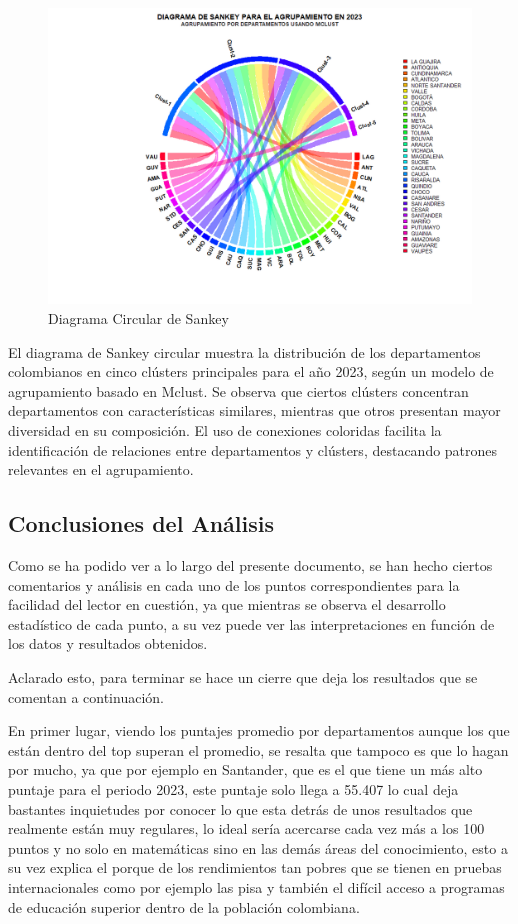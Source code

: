 \documentclass[12pt]{article}
\begin{document}
\begin{figure}[H]
    \centering
    \includegraphics[width=0.8\linewidth]{Imagenes/SankeyIndividual.png}
    \caption{Diagrama Circular de Sankey}
    \label{fig_enter_label}
\end{figure}

El diagrama de Sankey circular muestra la distribución de los departamentos colombianos en cinco clústers principales para el año 2023, según un modelo de agrupamiento basado en Mclust. Se observa que ciertos clústers concentran departamentos con características similares, mientras que otros presentan mayor diversidad en su composición. El uso de conexiones coloridas facilita la identificación de relaciones entre departamentos y clústers, destacando patrones relevantes en el agrupamiento.

\newpage

\subsection{Conclusiones del Análisis}

Como se ha podido ver a lo largo del presente documento, se han hecho ciertos comentarios y análisis en cada uno de los puntos correspondientes para la facilidad del lector en cuestión, ya que mientras se observa el desarrollo estadístico de cada punto, a su vez puede ver las interpretaciones en función de los datos y resultados obtenidos. 

Aclarado esto, para terminar se hace un cierre que deja los resultados que se comentan a continuación.

En primer lugar, viendo los puntajes promedio por departamentos aunque los que están dentro del top superan el promedio, se resalta que tampoco es que lo hagan por mucho, ya que por ejemplo en Santander, que es el que tiene un más alto puntaje para el periodo 2023, este puntaje solo llega a 55.407 lo cual deja bastantes inquietudes por conocer lo que esta detrás de unos resultados que realmente están muy regulares, lo ideal sería acercarse cada vez más a los 100 puntos y no solo en matemáticas sino en las demás áreas del conocimiento, esto a su vez explica el porque de los rendimientos tan pobres que se tienen en pruebas internacionales como por ejemplo las pisa y también el difícil acceso a programas de educación superior dentro de la población colombiana. 
\end{document}

